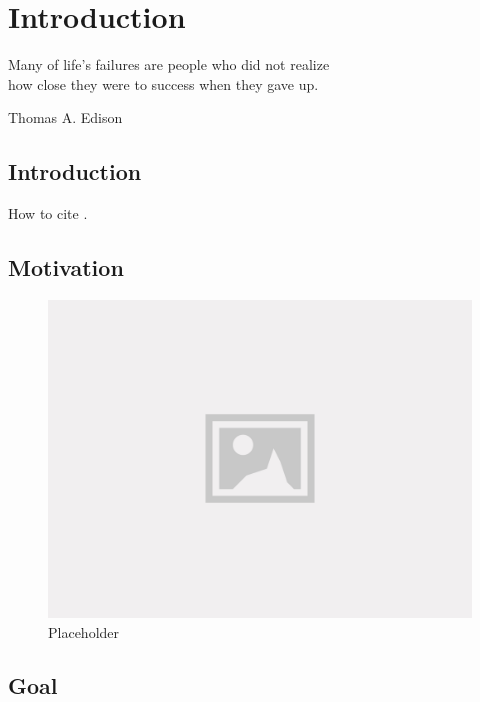 \chapter{Introduction}
\label{cha:introduction}

\epigraph{Many of life's failures are people who did not realize\\how close they were to success when they gave up.}{Thomas A. Edison}

\section{Introduction}
\label{sec:introduction}

How to cite \cite{yt:online}.

\lipsum[9]

\section{Motivation}
\label{sec:motivation}

\begin{figure}[!ht]
    \centering
    \includegraphics[width=0.9\linewidth]{media/placeholder.png}
    \caption[Placeholder]{Placeholder}
    \label{fig:srs_process}
\end{figure}

\lipsum[9]

\section{Goal}
\label{sec:goal}

\lipsum[1]

